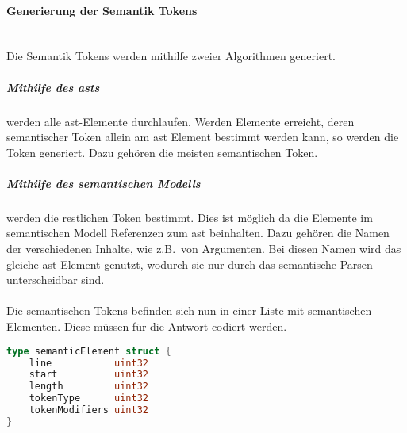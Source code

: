 \documentclass[./einleitung.tex]{subfiles}
\begin{document}
    \paragraph{Generierung der Semantik Tokens}\mbox{}\\
    Die Semantik Tokens werden mithilfe zweier Algorithmen generiert.
    \subparagraph{Mithilfe des \acrshort{ast}s} werden alle \acrshort{ast}-Elemente durchlaufen.
    Werden Elemente erreicht, deren semantischer Token allein am \acrshort{ast} Element bestimmt werden kann, so werden die Token generiert.
    Dazu gehören die meisten semantischen Token.
    \subparagraph{Mithilfe des semantischen Modells} werden die restlichen Token bestimmt.
    Dies ist möglich da die Elemente im semantischen Modell Referenzen zum \acrshort{ast} beinhalten.
    Dazu gehören die Namen der verschiedenen Inhalte, wie z.B.\ von Argumenten.
    Bei diesen Namen wird das gleiche \acrshort{ast}-Element genutzt, wodurch sie nur durch das semantische Parsen unterscheidbar sind.
    \\\\
    Die semantischen Tokens befinden sich nun in einer Liste mit semantischen Elementen.
    Diese müssen für die Antwort codiert werden.
    \begin{lstlisting}[language=Go, caption=semantisches Element, label=lst:semantic-element]
type semanticElement struct {
	line           uint32
	start          uint32
	length         uint32
	tokenType      uint32
	tokenModifiers uint32
}
    \end{lstlisting}
\end{document}
